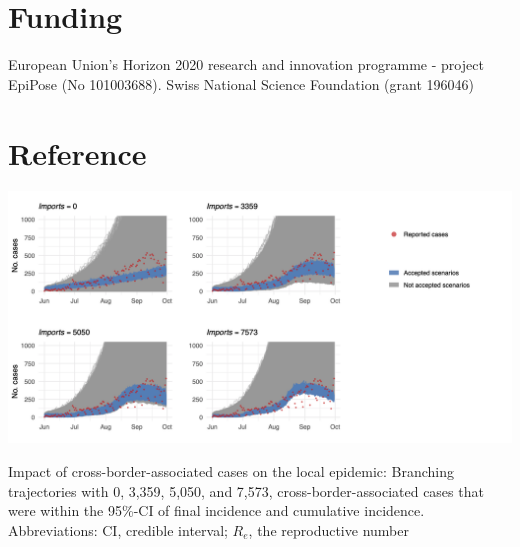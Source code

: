 \documentclass[10pt, a4paper, twoside]{article}
\begin{document}
\begin{multicols}{2}
\section{Funding}
European Union’s Horizon 2020 research and innovation programme - project EpiPose (No 101003688). Swiss National Science Foundation (grant 196046)

\section{Reference}



\end{multicols}

\clearpage
\begin{suppfigure}[h]
\centering
\includegraphics[scale=0.4]{SF1_2021-04-30.png}
\caption{Impact of cross-border-associated cases on the local epidemic: 
Branching trajectories with 0, 3,359, 5,050, and 7,573, cross-border-associated cases that were within the 95\%-CI of final incidence and cumulative incidence. 
Abbreviations: CI, credible interval; $R_e$, the reproductive number}
\label{sf1}
\end{suppfigure}
\end{document}
